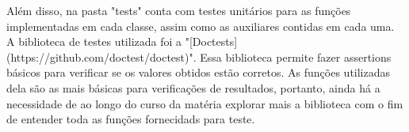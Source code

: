 Além disso, na pasta "{}tests"{} conta com testes unitários para as funções implementadas em cada classe, assim como as auxiliares contidas em cada uma. A biblioteca de testes utilizada foi a "{}\mbox{[}\+Doctests\mbox{]}(https\+://github.\+com/doctest/doctest)"{}. Essa biblioteca permite fazer assertions básicos para verificar se os valores obtidos estão corretos. As funções utilizadas dela são as mais básicas para verificações de resultados, portanto, ainda há a necessidade de ao longo do curso da matéria explorar mais a biblioteca com o fim de entender toda as funções fornecidads para teste. 